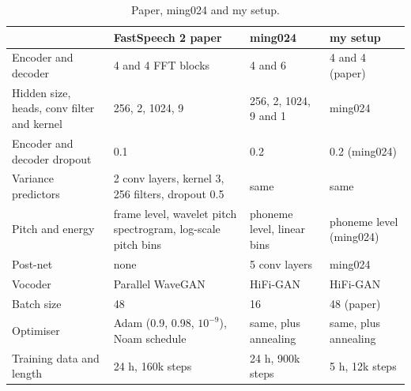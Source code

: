 \documentclass[11pt,a4paper]{article}
\begin{document}
\begin{table}[!htbp]
\centering\small
\begin{tabularx}{\textwidth}{>{\raggedright\arraybackslash}p{4.3cm}XXX}
\toprule
& \textbf{FastSpeech 2 paper} & \textbf{ming024} & \textbf{my setup} \\
\midrule
Encoder and decoder & 4 and 4 FFT blocks & 4 and 6 & 4 and 4 (paper) \\
Hidden size, heads, conv filter and kernel & 256, 2, 1024, 9 & 256, 2, 1024, 9 and 1 & ming024 \\
Encoder and decoder dropout & 0.1 & 0.2 & 0.2 (ming024) \\
Variance predictors & 2 conv layers, kernel 3, 256 filters, dropout 0.5 & same & same \\
Pitch and energy & frame level, wavelet pitch spectrogram, log-scale pitch bins & phoneme level, linear bins & phoneme level (ming024) \\
Post-net & none & 5 conv layers & ming024 \\
Vocoder & Parallel WaveGAN & HiFi-GAN & HiFi-GAN \\
Batch size & 48 & 16 & 48 (paper) \\
Optimiser & Adam (0.9, 0.98, $10^{-9}$), Noam schedule & same, plus annealing & same, plus annealing \\
Training data and length & 24 h, 160k steps & 24 h, 900k steps & 5 h, 12k steps \\
\bottomrule
\end{tabularx}
\caption{Paper, ming024 and my setup.}
\label{tab:paper}
\end{table}
\end{document}
